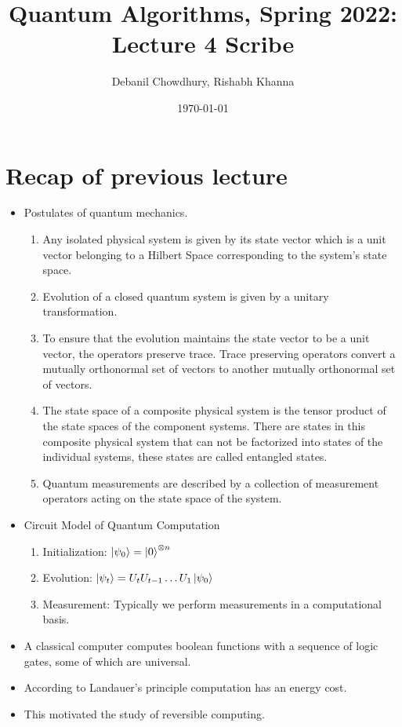 \documentclass[11.5pt, paper=a4]{article}
\title{Quantum Algorithms, Spring 2022: Lecture 4 Scribe}
\author{Debanil Chowdhury, Rishabh Khanna}
\date{\today}
\theoremstyle{definition}
\numberwithin{theorem}{section}
\begin{document}
\maketitle

\section{Recap of previous lecture}

    \begin{itemize}
        \item Postulates of quantum mechanics.
        \begin{enumerate}
            \item Any isolated physical system is given by its state vector which is a unit vector belonging to a Hilbert Space corresponding to the system’s state space.
            \item Evolution of a closed quantum system is given by a unitary transformation.
            \item To ensure that the evolution maintains the state vector to be a unit vector, the operators preserve trace. Trace preserving operators convert a mutually orthonormal set of vectors to another mutually orthonormal set of vectors.
            \item The state space of a composite physical system is the tensor product of the state spaces of the component systems. There are states in this composite physical system that can not be factorized into states of the individual systems, these states are called entangled states.
            \item Quantum measurements are described by a collection of measurement operators acting on the state space of the system.
        \end{enumerate}
        \item Circuit Model of Quantum Computation
        \begin{enumerate}
            \item Initialization: $\ket{\psi_0} = \ket{0}^{\otimes n}$
            \item Evolution: $\ket{\psi_t} = U_tU_{t-1}\ldots U_1\ket{\psi_0}$
            \item Measurement: Typically we perform measurements in a computational basis.
        \end{enumerate}
        \item A classical computer computes boolean functions with a sequence of logic gates, some of which are universal.
        \item According to Landauer's principle computation has an energy cost.
        \item This motivated the study of reversible computing.
    \end{itemize}
\end{document}
